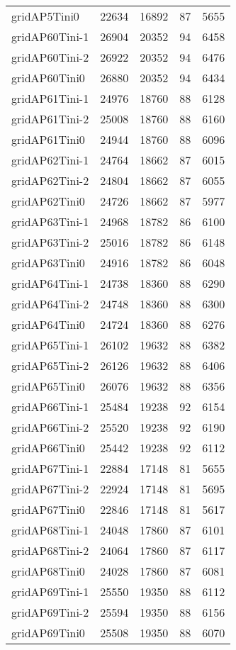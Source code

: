 \begin{longtable}{lrrrr}
gridAP5Tini0 & 22634 & 16892 & 87 & 5655 \\
gridAP60Tini-1 & 26904 & 20352 & 94 & 6458 \\
gridAP60Tini-2 & 26922 & 20352 & 94 & 6476 \\
gridAP60Tini0 & 26880 & 20352 & 94 & 6434 \\
gridAP61Tini-1 & 24976 & 18760 & 88 & 6128 \\
gridAP61Tini-2 & 25008 & 18760 & 88 & 6160 \\
gridAP61Tini0 & 24944 & 18760 & 88 & 6096 \\
gridAP62Tini-1 & 24764 & 18662 & 87 & 6015 \\
gridAP62Tini-2 & 24804 & 18662 & 87 & 6055 \\
gridAP62Tini0 & 24726 & 18662 & 87 & 5977 \\
gridAP63Tini-1 & 24968 & 18782 & 86 & 6100 \\
gridAP63Tini-2 & 25016 & 18782 & 86 & 6148 \\
gridAP63Tini0 & 24916 & 18782 & 86 & 6048 \\
gridAP64Tini-1 & 24738 & 18360 & 88 & 6290 \\
gridAP64Tini-2 & 24748 & 18360 & 88 & 6300 \\
gridAP64Tini0 & 24724 & 18360 & 88 & 6276 \\
gridAP65Tini-1 & 26102 & 19632 & 88 & 6382 \\
gridAP65Tini-2 & 26126 & 19632 & 88 & 6406 \\
gridAP65Tini0 & 26076 & 19632 & 88 & 6356 \\
gridAP66Tini-1 & 25484 & 19238 & 92 & 6154 \\
gridAP66Tini-2 & 25520 & 19238 & 92 & 6190 \\
gridAP66Tini0 & 25442 & 19238 & 92 & 6112 \\
gridAP67Tini-1 & 22884 & 17148 & 81 & 5655 \\
gridAP67Tini-2 & 22924 & 17148 & 81 & 5695 \\
gridAP67Tini0 & 22846 & 17148 & 81 & 5617 \\
gridAP68Tini-1 & 24048 & 17860 & 87 & 6101 \\
gridAP68Tini-2 & 24064 & 17860 & 87 & 6117 \\
gridAP68Tini0 & 24028 & 17860 & 87 & 6081 \\
gridAP69Tini-1 & 25550 & 19350 & 88 & 6112 \\
gridAP69Tini-2 & 25594 & 19350 & 88 & 6156 \\
gridAP69Tini0 & 25508 & 19350 & 88 & 6070 \\

\end{longtable}
